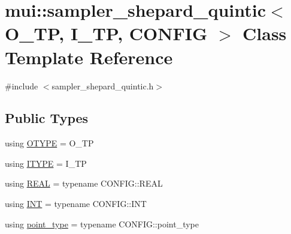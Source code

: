 \hypertarget{classmui_1_1sampler__shepard__quintic}{}\section{mui\+:\+:sampler\+\_\+shepard\+\_\+quintic$<$ O\+\_\+\+TP, I\+\_\+\+TP, C\+O\+N\+F\+IG $>$ Class Template Reference}
\label{classmui_1_1sampler__shepard__quintic}


{\ttfamily \#include $<$sampler\+\_\+shepard\+\_\+quintic.\+h$>$}

\subsection*{Public Types}
\begin{DoxyCompactItemize}
\item 
using \hyperlink{classmui_1_1sampler__shepard__quintic_ae71df3379dbdc49abd163d49eb310411}{O\+T\+Y\+PE} = O\+\_\+\+TP
\item 
using \hyperlink{classmui_1_1sampler__shepard__quintic_a449ad1b058df2448a50dab7822626fa6}{I\+T\+Y\+PE} = I\+\_\+\+TP
\item 
using \hyperlink{classmui_1_1sampler__shepard__quintic_ae674072eac8556d3520cf5f6c1eb7ae6}{R\+E\+AL} = typename C\+O\+N\+F\+I\+G\+::\+R\+E\+AL
\item 
using \hyperlink{classmui_1_1sampler__shepard__quintic_abf26df87b157e23e13d25d52da1337b9}{I\+NT} = typename C\+O\+N\+F\+I\+G\+::\+I\+NT
\item 
using \hyperlink{classmui_1_1sampler__shepard__quintic_ac80518ba9645191b9d6e2fbee760e031}{point\+\_\+type} = typename C\+O\+N\+F\+I\+G\+::point\+\_\+type
\end{DoxyCompactItemize}
